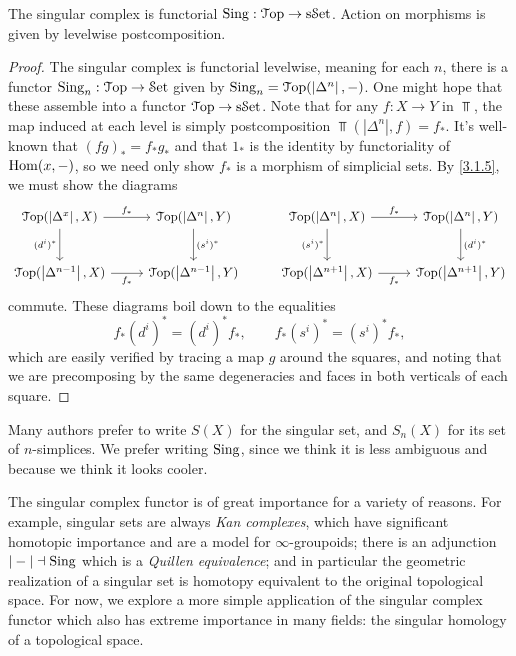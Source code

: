 \begin{proposition}\label{4.1.3}
	The singular complex is functorial $\operatorname{Sing} : \mathcal{T}\mathrm{op}  \to \mathrm{s}\mathcal{S}\mathrm{et} $. Action on morphisms is given by levelwise postcomposition.
\end{proposition}
\begin{proof}
	The singular complex is functorial levelwise, meaning for each $n$, there is a functor $\operatorname{Sing}_n : \mathcal{T}\mathrm{op}  \to \mathcal{S}\mathrm{et} $ given by $\operatorname{Sing}_n = \mathcal{T}\mathrm{op} (\left| \Delta^n \right| ,-)$. One might hope that these assemble into a functor $\mathcal{T}\mathrm{op} \to \mathrm{s}\mathcal{S}\mathrm{et} $. Note that for any $f : X \to Y$ in $\Top $, the map induced at each level is simply postcomposition $\Top(\left| \Delta^n \right| ,f)=f_*$. It's well-known that $(fg)_*=f_*g_*$ and that $1_*$ is the identity by functoriality of $\operatorname{Hom}(x,-)$, so we need only show $f_*$ is a morphism of simplicial sets. By \cref{3.1.5}, we must show the diagrams
	\[\begin{tikzcd}[row sep = 2.5em, column sep = 2.5em]
		\Top (\left| \Delta^x \right| ,X)\ar[" f_* ", r] \ar[" (d^i)^* "', d]  & \Top (\left| \Delta^n \right| ,Y)\ar[" (s^i)^* ", d]  & \Top (\left| \Delta^n \right| ,X)\ar[" f_* ", r] \ar[" (s^i)^* "', d]  & \Top (\left| \Delta^{n}  \right| ,Y)\ar[" (d^i)^* ", d]  \\
	\Top (\left| \Delta^{n-1}  \right| ,X)\ar[" f_* "', r]  & \Top (\left| \Delta^{n-1}  \right| ,Y) & \Top (\left| \Delta^{n+1}  \right| ,X)\ar[" f_* "', r]  & \Top (\left| \Delta^{n+1}  \right| ,Y)
	\end{tikzcd}\]
	commute. These diagrams boil down to the equalities
	\[
		f_*(d^i)^*=(d^i)^*f_*,\qquad f_*(s^i)^*=(s^i)^*f_*,
	\]
	which are easily verified by tracing a map $g$ around the squares, and noting that we are precomposing by the same degeneracies and faces in both verticals of each square.
\end{proof}

\begin{notation}\label{4.1.4}
	Many authors prefer to write $S(X)$ for the singular set, and $S_n(X)$ for its set of $n$-simplices. We prefer writing $\operatorname{Sing}$, since we think it is less ambiguous and because we think it looks cooler.
\end{notation}


The singular complex functor is of great importance for a variety of reasons. For example, singular sets are always \emph{Kan complexes}, which have significant homotopic importance and are a model for $\infty $-groupoids; there is an adjunction $|-|\dashv \operatorname{Sing}$ which is a \emph{Quillen equivalence}; and in particular the geometric realization of a singular set is homotopy equivalent to the original topological space. For now, we explore a more simple application of the singular complex functor which also has extreme importance in many fields: the singular homology of a topological space.

